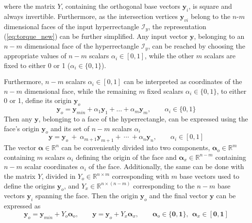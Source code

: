 where the matrix $Y$, containing the orthogonal base vectors $\bm{y}_i$, is square and always invertible. 
Furthermore, as the intersection vertices $\bm{y}_{vi}$ belong to the $n$-$m$ dimensional faces of the input hyperrectangle $\mathcal{I}_y$, the representation (\ref{eq:torque_new}) can be further simplified. Any input vector $\bm{y}$, belonging to an $n-m$ dimensional face of the hyperrectangle $\mathcal{I}_y$, can be reached by choosing the appropriate values of $n-m$ scalars $\alpha_i\in[0,1]$, while the other $m$ scalars are fixed to either 0 or 1 ($\alpha_i\in\{0,1\}$).

Furthermore, $n-m$ scalars $\alpha_i\in[0,1]$ can be interpreted as coordinates of the $n-m$ dimensional face, while the remaining $m$ fixed scalars $\alpha_i\in\{0,1\}$, to either 0 or 1, define its origin $\bm{y}_o$
\begin{equation}
    \bm{y}_o = \bm{y}_{min} + \alpha_1 \bm{y}_1+ ... + \alpha_m \bm{y}_m, \qquad \alpha_i \in\{0,1\}
\end{equation} 
Then any $\bm{y}$, belonging to a face of the hyperrectangle, can be expressed using the face's origin $\bm{y}_o$ and its set of $n-m$ scalars $\alpha_i$ 
\begin{equation}
    \bm{y} = \bm{y}_o ~+ ~\alpha_{m+1}\bm{y}_{m+1} +~\cdots~ +\alpha_{n}\bm{y}_{n}, \qquad \alpha_i \in [0,1]
\end{equation}
The vector $\bm{\alpha}\in\mathbb{R}^n$ can be conveniently divided into two components, $\bm{\alpha}_o\in\mathbb{R}^m$ containing $m$ scalars $\alpha_i$ defining the origin of the face and $\bm{\alpha}_x\in\mathbb{R}^{n-m}$ containing $n-m$ scalar coordinates $\alpha_i$ of the face. Additionally, the same can be done with the matrix $Y$, divided in $Y_o\in\mathbb{R}^{n\times m}$ corresponding with $m$ base vectors used to define the origins $\bm{y}_o$, and $Y_x\in\mathbb{R}^{n\times (n-m)}$
 corresponding to the $n\!-\!m$ base vectors $\bm{y}_i$ spanning the face. Then the origin $\bm{y}_o$ and the final vector $\bm{y}$ can be expressed as
 \begin{equation}
    \bm{y}_o = \bm{y}_{min} + Y_o\bm{\alpha}_{o}, \qquad \bm{y} = \bm{y}_o +  Y_x\bm{\alpha}_{x}, \qquad \bm{\alpha}_{o}\in\{\bm{0},\bm{1}\},~~ \bm{\alpha}_{x}\in[\bm{0},\bm{1}]
    \label{eq:matrix_new_y}
\end{equation}

